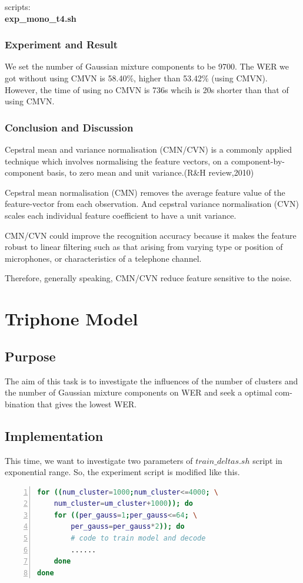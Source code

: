 \documentclass[]{article}
\begin{document}
\begin{multicols*}{2}
scripts: \textbf{\\ \indent exp\_mono\_t4.sh}

\subsubsection{Experiment and Result}
We set the number of Gaussian mixture components to be 9700. The WER we got without using CMVN is 58.40\%, higher than 53.42\% (using CMVN). However, the time of using no CMVN is 736s whcih is 20s  shorter than that of using CMVN.

\subsubsection{Conclusion and Discussion}

Cepstral mean and variance normalisation (CMN/CVN) is a commonly applied technique which involves normalising the feature vectors, on a component-by-component basis, to zero mean and unit variance.(R\&H review,2010)

Cepstral mean normalisation (CMN) removes the average feature value
of the feature-vector from each observation. And cepstral variance normalisation (CVN) scales each individual feature coefficient to have a unit variance.

CMN/CVN could improve the recognition accuracy because it makes the feature robust to linear filtering such as that arising from varying type or position of microphones, or characteristics of a telephone channel.

Therefore, generally speaking, CMN/CVN reduce feature sensitive to the noise. 

\section{Triphone Model}
\subsection{Purpose}
The aim of this task is to investigate the influences of the number of clusters and the number of Gaussian mixture components on WER and seek a optimal com- bination that gives the lowest WER.
\subsection{Implementation}
This time, we want to investigate two parameters of $train\_deltas.sh$ script in exponential range. So, the experiment script is modified like this.
\begin{lstlisting}[language=sh,showstringspaces=false,numbers=left,tabsize=4, xleftmargin=\parindent, frame=single, basicstyle=\tiny] 
for ((num_cluster=1000;num_cluster<=4000; \
	num_cluster=um_cluster+1000)); do
	for ((per_gauss=1;per_gauss<=64; \
		per_gauss=per_gauss*2)); do
		# code to train model and decode
		......
	done
done
\end{lstlisting}


\end{multicols*}
\end{document}
